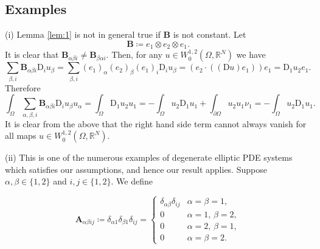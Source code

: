 \documentclass{amsart}
\numberwithin{equation}{section}
\numberwithin{thm}{section}
\theoremstyle{definition}
\renewcommand{\:}{\!:\!} %
\renewcommand{\^}[1]{^{#1}_{\phantom{l}}}
\begin{document}
\subsection*{Examples} (i) Lemma \ref{lem:1} is not in general true if $\mathbf{B}$ is not constant. Let
\[
\mathbf{B} \coloneqq e_1 \otimes e_2 \otimes e_1.
\]
It is clear that $\mathbf{B}_{\alpha \beta i} \neq \mathbf{B}_{\beta \alpha i}$. Then, for any $u \in W^{1,2}_0(\Omega, \mathbb{R}^N)$ we have
\begin{equation*}
\sum_{\beta, i} \mathbf{B}_{\alpha \beta i}\mathrm{D}_iu_\beta = \sum_{\beta, i} (e_1)_\alpha (e_2)_\beta (e_1)_i\mathrm{D}_iu_\beta = (e_2 \cdot ((\mathrm{D}u)e_1))e_1 = \mathrm{D}_1u_2 e_1. 
\end{equation*}
Therefore
\begin{equation*}
\int_{\Omega} \sum_{\alpha, \beta, i} \mathbf{B}_{\alpha \beta i}\mathrm{D}_iu_\beta u_\alpha  = \int_{\Omega} \mathrm{D}_1 u_2 u_1 =  -\int_{\Omega} u_2 \mathrm{D}_1u_1 + \int_{\partial \Omega} u_2u_1 \nu_1 =  -\int_{\Omega} u_2 \mathrm{D}_1u_1.
\end{equation*}
It is clear from the above that the right hand side term cannot always vanish for all maps $u \in W^{1,2}_0(\Omega, \mathbb{R}^N)$.

\smallskip

\noindent (ii) This is one of the numerous examples of degenerate elliptic PDE systems which satisfies our assumptions, and hence our result applies. Suppose $\alpha, \beta \in \{1, 2\}$ and $i, j \in \{1, 2\}$. We define 

\begin{equation*}
\mathbf{A}_{\alpha \beta i j} \coloneqq  \delta_{\alpha 1} \delta_{\beta 1}\delta_{i j} = \begin{cases}
\delta_{\alpha \beta} \delta_{ij} &\text{$\alpha = \beta = 1$},\\
0 &\text{$\alpha = 1$, $\beta = 2$},\\
0 &\text{$\alpha = 2$, $\beta = 1$},\\
0 &\text{$\alpha = \beta = 2$}.
\end{cases} 
\end{equation*}
\end{document}
